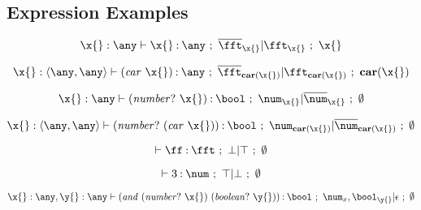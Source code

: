 \documentclass{article}[12pt]
\begin{document}
\subsection{Expression Examples}

\newcommand{\nump}[1]{\ma{\comb{\numberp}{#1}}}

\newcommand{\carx}{\ma{\comb{\car}{\x{ }}}}

\newcommand{\pecarx}{\ma{\pecar(\x{})}}
\newcommand{\pecarcarx}{\ma{\pecar(\pecar(\x{}))}}

\newcommand{\xenv}[1]{\x{}:{#1}}
\newcommand{\xenvtop}{\xenv{\topty}}
\newcommand{\xyenv}{\xenvtop,\y{}:\topty}


\newcommand{\numpx}{\nump{\x{}}}
\newcommand{\boolpx}{\comb{\boolp}{\x{}}}
\newcommand{\boolpy}{\comb{\boolp}{\y{}}}

\newcommand{\cand}[2]{\comb{\andsym}{{#1}\ {#2}}}
\newcommand{\cor}[2]{\comb{\orsym}{{#1}\ {#2}}}

\newcommand{\numbool}{{(\usym\ \num\ \bool)}}
\newcommand{\inumbool}{{(\isym\ \num\ \bool)}}


\begin{displaymath}
  \hastyvar[\xenvtop]{\x{}}{\topty}{\x{}}
\end{displaymath}

\begin{displaymath}
  \hastyvar[{\xenv{\consty{\topty}{\topty}}{}}]{\carx{}}{\topty}{\pecarx{}}
\end{displaymath}

\begin{displaymath}
  \hastypred [\xenvtop] {\numpx} {\num} {\x{}}
\end{displaymath}

\begin{displaymath}
  \hastypred [\xenv{\consty{\topty}{\topty}}] {\nump{\carx}} {\num} {\pecarx}
\end{displaymath}

\begin{displaymath}
  \hastyfalse[\empty]{\ff}{\fft}
\end{displaymath}

\begin{displaymath}
  \hastytrue[\empty]{3}{\num}
\end{displaymath}

\begin{displaymath}
  \hastyeff[\xyenv] {\cand{\numpx}{\boolpy}} {\bool} {\num_{x{}},\bool_{\y{}}}  {\bullet} {\noeffect}
\end{displaymath}
\end{document}
